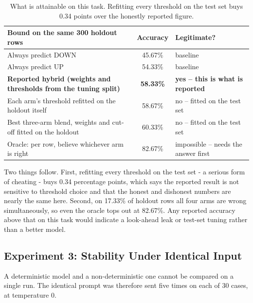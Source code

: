 \begin{table}[H]
\centering
\footnotesize
\begin{tabularx}{\textwidth}{@{}Ycp{4.6cm}@{}}
\toprule
\textbf{Bound on the same 300 holdout rows} & \textbf{Accuracy} & \textbf{Legitimate?} \\
\midrule
Always predict DOWN & 45.67\% & baseline \\
Always predict UP & 54.33\% & baseline \\
\textbf{Reported hybrid (weights and thresholds from the tuning split)} & \textbf{58.33\%} & \textbf{yes -- this is what is reported} \\
Each arm's threshold refitted on the holdout itself & 58.67\% & no -- fitted on the test set \\
Best three-arm blend, weights and cut-off fitted on the holdout & 60.33\% & no -- fitted on the test set \\
Oracle: per row, believe whichever arm is right & 82.67\% & impossible -- needs the answer first \\
\bottomrule
\end{tabularx}
\caption{What is attainable on this task. Refitting every threshold on the test set buys 0.34 points over the honestly reported figure.}
\label{tab:attainable-bounds}
\end{table}

Two things follow. First, refitting every threshold on the test set - a
serious form of cheating - buys 0.34 percentage points, which says the
reported result is not sensitive to threshold choice and that the honest
and dishonest numbers are nearly the same here. Second, on 17.33\% of
holdout rows all four arms are wrong simultaneously, so even the oracle
tops out at 82.67\%. Any reported accuracy above that on this task would
indicate a look-ahead leak or test-set tuning rather than a better
model.

\subsection{Experiment 3: Stability Under Identical Input}\label{sec:stability}

A deterministic model and a non-deterministic one cannot be compared on
a single run. The identical prompt was therefore sent five times on each
of 30 cases, at temperature 0.

